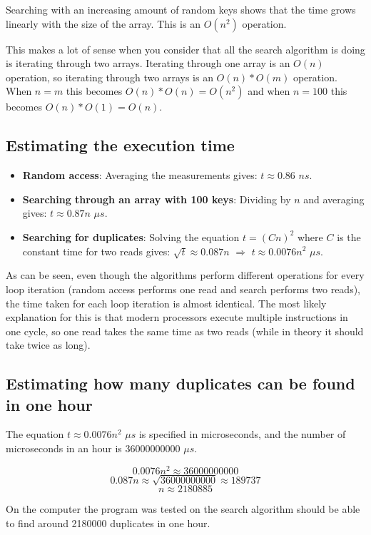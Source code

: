\documentclass[a4paper,11pt]{article}
\begin{document}
Searching with an increasing amount of random keys shows that the time grows linearly with the size of the array. This is an $O(n^2)$ operation.

This makes a lot of sense when you consider that all the search algorithm is doing is iterating through two arrays.
Iterating through one array is an $O(n)$ operation, so iterating through two arrays is an $O(n)*O(m)$ operation. When $n=m$ this becomes $O(n)*O(n) = O(n^2)$ and when $n=100$ this becomes $O(n) * O(1) = O(n)$.

\subsection*{Estimating the execution time}

\begin{itemize}
  \item \textbf{Random access}: Averaging the measurements gives: $t\approx0.86$ $ns$.
  \item \textbf{Searching through an array with 100 keys}: Dividing by $n$ and averaging gives: $t\approx 0.87n$ $\mu s$.
  \item \textbf{Searching for duplicates}: Solving the equation $t = (Cn)^2$ where $C$ is the constant time for two reads gives: $\sqrt{t}\approx 0.087n$ $\Rightarrow$ $t\approx 0.0076n^2$ $\mu s$.
\end{itemize}

As can be seen, even though the algorithms perform different operations for every loop iteration (random access performs one read and search performs two reads), the time taken for each loop iteration is almost identical.
The most likely explanation for this is that modern processors execute multiple instructions in one cycle, so one read takes the same time as two reads (while in theory it should take twice as long).

\subsection*{Estimating how many duplicates can be found in one hour}

The equation $t\approx 0.0076n^2$ $\mu s$ is specified in microseconds, and the number of microseconds in an hour is 36000000000 $\mu s$.

\begin{equation*}
0.0076n^2 \approx 36000000000
\end{equation*}
\begin{equation*}
0.087n \approx \sqrt{36000000000} \approx 189737
\end{equation*}
\begin{equation*}
n \approx 2180885
\end{equation*}

On the computer the program was tested on the search algorithm should be able to find around 2180000 duplicates in one hour.
\end{document}
